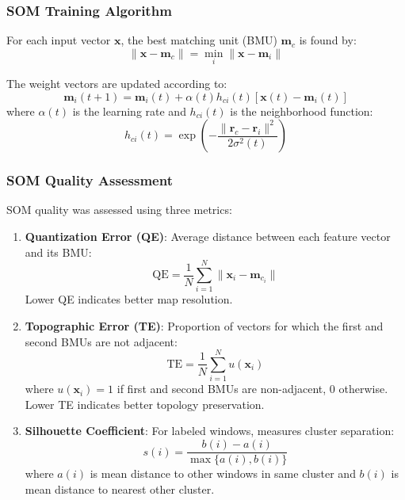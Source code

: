\subsubsection{SOM Training Algorithm}

For each input vector $\mathbf{x}$, the best matching unit (BMU) $\mathbf{m}_c$ is found by:
\begin{equation}
\|\mathbf{x} - \mathbf{m}_c\| = \min_i \|\mathbf{x} - \mathbf{m}_i\|
\end{equation}

The weight vectors are updated according to:
\begin{equation}
\mathbf{m}_i(t+1) = \mathbf{m}_i(t) + \alpha(t) h_{ci}(t) [\mathbf{x}(t) - \mathbf{m}_i(t)]
\end{equation}
where $\alpha(t)$ is the learning rate and $h_{ci}(t)$ is the neighborhood function:
\begin{equation}
h_{ci}(t) = \exp\left(-\frac{\|\mathbf{r}_c - \mathbf{r}_i\|^2}{2\sigma^2(t)}\right)
\end{equation}

\subsubsection{SOM Quality Assessment}

SOM quality was assessed using three metrics:

\begin{enumerate}
    \item \textbf{Quantization Error (QE)}: Average distance between each feature vector and its BMU:
    \begin{equation}
    \text{QE} = \frac{1}{N} \sum_{i=1}^N \|\mathbf{x}_i - \mathbf{m}_{c_i}\|
    \end{equation}
    Lower QE indicates better map resolution.
    
    \item \textbf{Topographic Error (TE)}: Proportion of vectors for which the first and second BMUs are not adjacent:
    \begin{equation}
    \text{TE} = \frac{1}{N} \sum_{i=1}^N u(\mathbf{x}_i)
    \end{equation}
    where $u(\mathbf{x}_i) = 1$ if first and second BMUs are non-adjacent, 0 otherwise. Lower TE indicates better topology preservation.
    
    \item \textbf{Silhouette Coefficient}: For labeled windows, measures cluster separation:
    \begin{equation}
    s(i) = \frac{b(i) - a(i)}{\max\{a(i), b(i)\}}
    \end{equation}
    where $a(i)$ is mean distance to other windows in same cluster and $b(i)$ is mean distance to nearest other cluster.
\end{enumerate}

